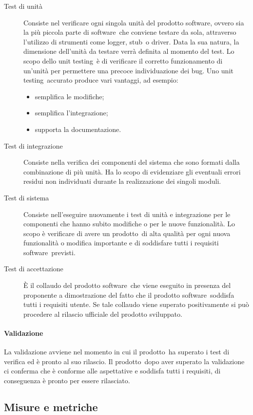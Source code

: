\documentclass[../PianoDiQualifica.tex]{subfiles}
\begin{document}
					\begin{description}
						\item [Test di unità] Consiste nel verificare ogni singola unità del prodotto software\g, ovvero sia la più piccola parte di software\g\ che conviene testare da sola, attraverso l'utilizzo di strumenti come logger\g, stub\g\ o driver\g. Data la sua natura, la dimensione dell'unità da testare verrà definita al momento del test. Lo scopo dello unit testing\g\ è di verificare il corretto funzionamento di un'unità per permettere una precoce individuazione dei bug\g. Uno unit testing\g\ 
accurato produce vari vantaggi, ad esempio:
						\begin{itemize}
							\item semplifica le modifiche;
							\item semplifica l'integrazione;
							\item supporta la documentazione.
						\end{itemize}
						\item[Test di integrazione] Consiste nella verifica dei componenti del sistema che sono formati dalla combinazione di più unità. Ha lo scopo di evidenziare gli eventuali errori residui non individuati durante la realizzazione dei singoli moduli.
						\item[Test di sistema] Consiste nell'eseguire nuovamente i test di unità e integrazione per le componenti che hanno subito modifiche o per le nuove funzionalità. Lo scopo è verificare di avere un prodotto\g\ di alta qualità per ogni nuova funzionalità o modifica importante e di soddisfare tutti i requisiti software\g\ previsti.
						\item[Test di accettazione] È il collaudo del prodotto software\g\ che viene eseguito in presenza del proponente a dimostrazione del fatto che il prodotto 
software\g\ 
soddisfa tutti i requisiti utente. Se tale collaudo viene superato positivamente si può procedere al rilascio ufficiale del prodotto sviluppato. 
					\end{description}
				\paragraph{Validazione}
				La validazione avviene nel momento in cui il prodotto\g\ ha superato i test di verifica ed è pronto al suo rilascio. Il prodotto\g\ 
dopo aver superato la validazione ci conferma che è conforme alle aspettative e soddisfa tutti i requisiti, di conseguenza è pronto per essere rilasciato.
		\subsection{Misure e metriche}\label{sec3.3}
\end{document}
